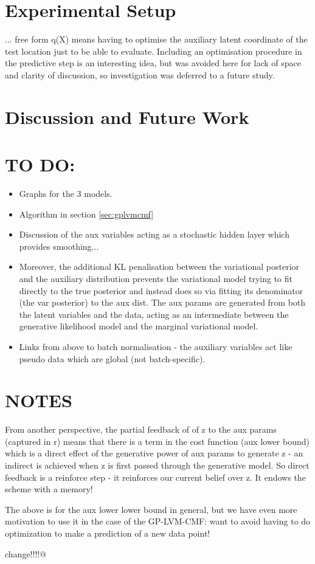 \documentclass[]{article}
\begin{document}
\section{Experimental Setup}\label{sec:experiments}

... free form q(X) means having to optimise the auxiliary latent coordinate of the test location just to be able to evaluate.
Including an optimisation procedure in the predictive step is an interesting idea, but was avoided here for lack of space and clarity of discussion, so investigation was deferred to a future study.

\section{Discussion and Future Work}\label{sec:discussion}

\section{TO DO:}
\begin{itemize}
  \item Graphs for the 3 models.
  \item Algorithm in section \ref{sec:gplvmcmf}
  \item Discussion of the aux variables acting as a stochastic hidden layer which provides smoothing...
  \item Moreover, the additional KL penalisation between the variational posterior and the auxiliary distribution prevents the variational model trying to fit directly to the true posterior and instead does so via fitting its denominator (the var posterior) to the aux dist. The aux params are generated from both the latent variables and the data, acting as an intermediate between the generative likelihood model and the marginal variational model.
  \item Links from above to batch normalisation - the auxiliary variables act like pseudo data which are global (not batch-specific).
\end{itemize}

\section{NOTES}

From another perspective, the partial feedback of of z to the aux params (captured in r) means that there is a term in the cost function (aux lower bound) which is a direct effect of the generative power of aux params to generate z - an indirect is achieved when z is first passed through the generative model. So direct feedback is a reinforce step - it reinforces our current belief over z.
It endows the scheme with a memory!

The above is for the aux lower lower bound in general, but we have even more motivation to use it in the case of the GP-LVM-CMF: want to avoid having to do optimization to make a prediction of a new data point!

change!!!!@

{}

\end{document}
